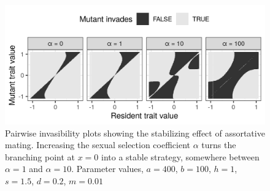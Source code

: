 \begin{figure}
    \centering
    \includegraphics[width=\textwidth]{figures/pairwise_invasibility_plots_test_alpha}
    \caption{Pairwise invasibility plots showing the stabilizing effect of assortative mating. Increasing the sexual selection coefficient $\alpha$ turns the branching point at $x = 0$ into a stable strategy, somewhere between $\alpha = 1$ and $\alpha = 10$. Parameter values, $a = 400$, $b = 100$, $h = 1$, $s = 1.5$, $d = 0.2$, $m = 0.01$}
    \label{fig:pairwise_invasibility_alpha}
\end{figure}